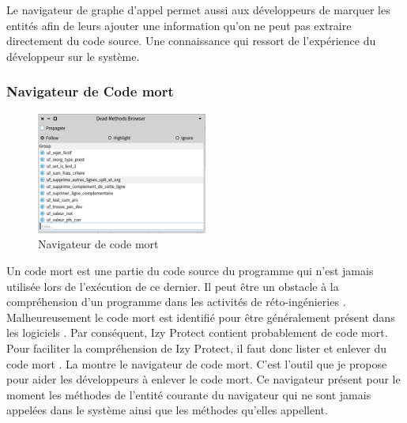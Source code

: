 \documentclass[a4paper]{article}
\begin{document}
Le navigateur de graphe d'appel permet aussi aux développeurs de marquer les entités afin de leurs ajouter une information qu'on ne peut pas extraire directement du code source.
Une connaissance qui ressort de l'expérience du développeur sur le système.

\subsubsection{Navigateur de Code mort}

\begin{figure}[htbp]
  \begin{center}
  \includegraphics[width=0.5\textwidth]{./figures/deadMethodBrowser.png}
  \caption{Navigateur de code mort}
  \label{fig:deadMethodBrowser}
\end{center}
\vspace{-0.3cm}
\end{figure}
Un code mort est une partie du code source du programme qui n'est jamais utilisée lors de l'exécution de ce dernier.
Il peut être un obstacle à la compréhension d'un programme dans les activités de réto-ingénieries \cite{Wang17a}.
Malheureusement le code mort est identifié pour être généralement présent dans les logiciels \cite{Roma18}. 
Par conséquent, Izy Protect contient probablement de code mort.
Pour faciliter la compréhension de Izy Protect, il faut donc lister et enlever du  code mort .
La  montre le navigateur de code mort.
C'est l'outil que je propose pour aider les développeurs à enlever le code mort.
Ce navigateur présent pour le moment les méthodes de l'entité courante du navigateur qui ne sont jamais appelées dans le système ainsi que les méthodes qu'elles appellent.
\end{document}
